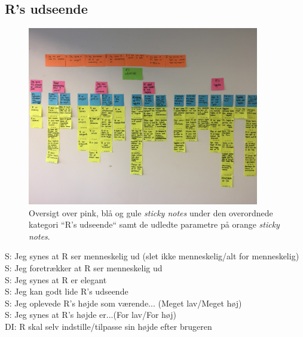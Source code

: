 \subsection{R's udseende}
%
\begin{figure}[H]
\centering
\includegraphics[width = 0.9\textwidth]{Figure/AffinityDiagram/RsUdseende} 
\caption{Oversigt over pink, blå og gule \textit{sticky notes} under den overordnede kategori ``R's udseende`` samt de udledte parametre på orange \textit{sticky notes}.}
\label{fig:AFRsUdseende}
\end{figure}
\noindent
%
S: Jeg synes at R ser menneskelig ud (slet ikke menneskelig/alt for menneskelig)\\
S: Jeg foretrækker at R ser menneskelig ud\\
S: Jeg synes at R er elegant\\
S: Jeg kan godt lide R's udseende\\
S: Jeg oplevede R's højde som værende... (Meget lav/Meget høj)\\
S: Jeg synes at R's højde er...(For lav/For høj)\\
DI: R skal selv indstille/tilpasse sin højde efter brugeren\\

